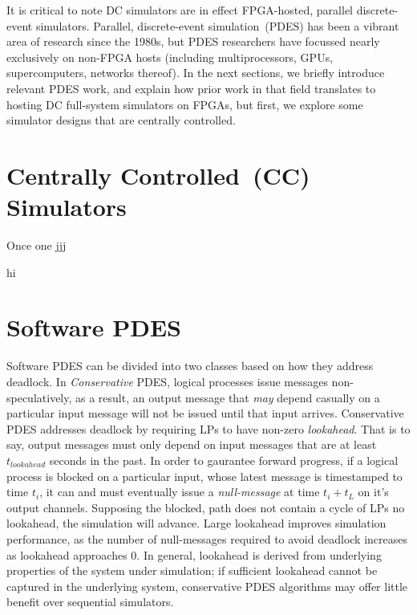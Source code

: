It is critical to note DC simulators are in effect FPGA-hosted, parallel
discrete-event simulators.  Parallel, discrete-event simulation~(PDES) has been
a vibrant area of research since the 1980s, but PDES researchers have focussed
nearly exclusively on non-FPGA hosts (including multiprocessors, GPUs,
supercomputers, networks thereof).  In the next sections, we briefly introduce
relevant PDES work, and explain how prior work in that field translates to
hosting DC full-system simulators on FPGAs, but first, we explore some
simulator designs that are centrally controlled.

\section{Centrally Controlled~(CC) Simulators}

Once one  jjj

hi








\section{Software PDES}
Software PDES can be divided into two classes based on how they address
deadlock.  In \emph{Conservative} PDES, logical processes issue messages
non-speculatively, as a result, an output message that \emph{may} depend casually on a
particular input message will not be issued until that input arrives.
Conservative PDES addresses deadlock by requiring LPs to have non-zero
\emph{lookahead}. That is to say, output messages must only depend on input
messages that are at least  $t_{lookahead}$ seconds in the past. In order to gaurantee forward
progress, if a logical process is blocked on a particular input, whose latest
message is timestamped to time $t_{i}$, it can and must eventually issue a
\emph{null-message} at time $t_{i} + t_{L}$ on it's output channels. Supposing
the blocked, path does not contain a cycle of LPs no lookahead, the simulation
will advance.  Large lookahead improves simulation performance, as the number
of null-messages required to avoid deadlock increases as lookahead approaches 0.
In general, lookahead is derived from underlying properties of the system under simulation;
if sufficient lookahead cannot be captured in the underlying system, conservative PDES algorithms may
offer little benefit over sequential simulators.

